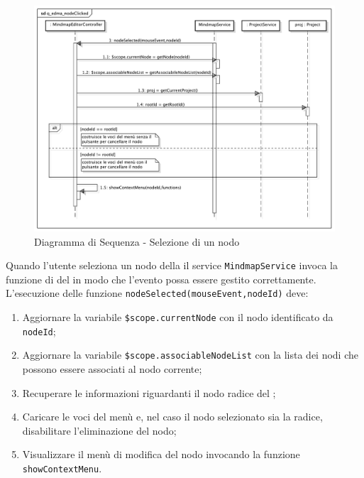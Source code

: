 \begin{center}
\begin{figure}[h]
\centering
\includegraphics[scale=0.33,keepaspectratio]{diagrammi/sequenza/FrontEnd/controllers/q_edma_nodeClicked.pdf}
\caption{Diagramma di Sequenza - Selezione di un nodo}
\end{figure}
\end{center}
\FloatBarrier
Quando l'utente seleziona un nodo della  il service \texttt{MindmapService} invoca la funzione di \textit{} del  in modo che l'evento possa essere gestito correttamente.\\
L'esecuzione delle funzione \texttt{nodeSelected(mouseEvent,nodeId)} deve:
\begin{enumerate}
\item Aggiornare la variabile \texttt{\$scope.currentNode} con il nodo identificato da \texttt{nodeId};
\item Aggiornare la variabile \texttt{\$scope.associableNodeList} con la lista dei nodi che possono essere associati al nodo corrente;
\item Recuperare le informazioni riguardanti il nodo radice del ;
\item Caricare le voci del menù e, nel caso il nodo selezionato sia la radice, disabilitare l'eliminazione del nodo;
\item Visualizzare il menù di modifica del nodo invocando la funzione \texttt{showContextMenu}.
\end{enumerate}
\label{cdup}
